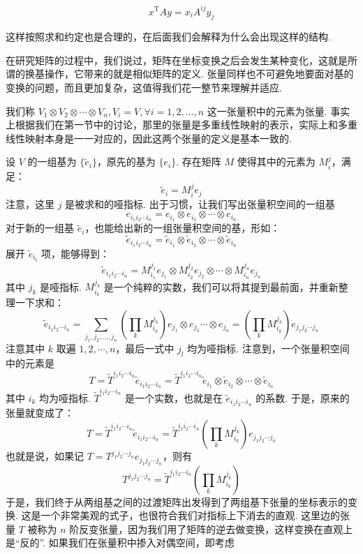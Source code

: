 \[
x^\mathrm{T} A y = x_i A^{ij} y_j
\]

这样按照求和约定也是合理的，在后面我们会解释为什么会出现这样的结构.

在研究矩阵的过程中，我们说过，矩阵在坐标变换之后会发生某种变化，这就是所谓的换基操作，它带来的就是相似矩阵的定义. 张量同样也不可避免地要面对基的变换的问题，而且更加复杂，这值得我们花一整节来理解并适应.

我们称 $V_1 \otimes V_2 \otimes \cdots \otimes V_n, V_i = V, \forall i = 1, 2, ..., n$ 这一张量积中的元素为张量. 事实上根据我们在第一节中的讨论，那里的张量是多重线性映射的表示，实际上和多重线性映射本身是一一对应的，因此这两个张量的定义是基本一致的.

设 $V$ 的一组基为 $\{\tilde{e}_{i}\}$，原先的基为 $\{e_i\}$. 存在矩阵 $M$ 使得其中的元素为 $M_i^j$，满足：
\[
\tilde e_{i} = M_i^j e_j
\]
注意，这里 $j$ 是被求和的哑指标. 出于习惯，让我们写出张量积空间的一组基
\[
e_{i_1 i_2 \cdots i_n} = e_{i_1} \otimes e_{i_2} \otimes \cdots \otimes e_{i_n}
\]
对于新的一组基 $\tilde{e}_{i}$，也能给出新的一组张量积空间的基，形如：
\[
\tilde{e}_{i_1 i_2 \cdots i_n} = \tilde{e}_{i_1} \otimes \tilde{e}_{i_2} \otimes \cdots \otimes \tilde{e}_{i_n}
\]
展开 $\tilde e_{i_t}$ 项，能够得到：
\[
\tilde{e}_{i_1 i_2 \cdots i_n} = M_{i_1}^{j_1} e_{j_1} \otimes M_{i_2}^{j_2} e_{j_2} \otimes \cdots \otimes M_{i_n}^{j_n} e_{j_n}
\]
其中 $j_k$ 是哑指标. $M_{i_k}^{j_k}$ 是一个纯粹的实数，我们可以将其提到最前面，并重新整理一下求和：
\[
\tilde{e}_{i_1 i_2 \cdots i_n} = \sum_{j_1, j_2, \ldots, j_n} \left( \prod_k M_{i_k}^{j_k} \right) e_{j_1} \otimes e_{j_2} \cdots \otimes e_{j_n} = \left( \prod_k M_{i_k}^{j_k} \right) e_{j_1 j_2 \cdots j_n}
\]
注意其中 $k$ 取遍 $1, 2, \cdots, n$，最后一式中 $j_l$ 均为哑指标.
注意到，一个张量积空间中的元素是
\[
T = \tilde T^{i_1 i_2 \cdots i_n} \tilde e_{i_1 i_2 \cdots i_n} = \tilde T^{i_1 i_2 \cdots i_n} \tilde e_{i_1} \otimes \tilde e_{i_2} \otimes \cdots \otimes \tilde e_{i_n}
\]
其中 $i_k$ 均为哑指标. $\tilde T^{i_1 i_2 \cdots i_n}$ 是一个实数，也就是在 $\tilde e_{i_1 i_2 \cdots i_n}$ 的系数. 于是，原来的张量就变成了：
\[
T = \tilde T^{i_1 i_2 \cdots i_n} \tilde e_{i_1 i_2 \cdots i_n} = \tilde T^{i_1 i_2 \cdots i_n} \left( \prod_k M_{i_k}^{j_k} \right) e_{j_1 j_2 \cdots j_n}
\]
也就是说，如果记 $T = T^{j_1 j_2 \cdots j_n} e_{j_1 j_2 \cdots j_n}$，则有
\[
T^{j_1 j_2 \cdots j_n} = \tilde T^{i_1 i_2 \cdots i_n} \left( \prod_k M_{i_k}^{j_k} \right)
\]
于是，我们终于从两组基之间的过渡矩阵出发得到了两组基下张量的坐标表示的变换. 这是一个非常美观的式子，也很符合我们对指标上下消去的直观. 这里边的张量 $T$ 被称为 $n$ 阶反变张量，因为我们用了矩阵的逆去做变换，这样变换在直观上是``反的''. 如果我们在张量积中掺入对偶空间，即考虑
